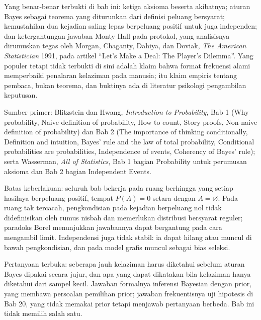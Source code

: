 \begin{untukpeneliti}
Yang benar-benar terbukti di bab ini: ketiga aksioma beserta akibatnya; aturan Bayes
sebagai teorema yang diturunkan dari definisi peluang bersyarat; kemustahilan dua
kejadian saling lepas berpeluang positif untuk juga independen; dan ketergantungan
jawaban Monty Hall pada protokol, yang analisisnya dirumuskan tegas oleh Morgan,
Chaganty, Dahiya, dan Doviak, \emph{The American Statistician} 1991, pada artikel
``Let's Make a Deal: The Player's Dilemma''. Yang populer tetapi tidak terbukti di sini
adalah klaim bahwa format frekuensi alami memperbaiki penalaran kelaziman pada manusia;
itu klaim empiris tentang pembaca, bukan teorema, dan buktinya ada di literatur
psikologi pengambilan keputusan.
\end{untukpeneliti}

Sumber primer: Blitzstein dan Hwang, \emph{Introduction to Probability}, Bab 1 (Why
probability, Naive definition of probability, How to count, Story proofs, Non-naive
definition of probability) dan Bab 2 (The importance of thinking conditionally,
Definition and intuition, Bayes' rule and the law of total probability, Conditional
probabilities are probabilities, Independence of events, Coherency of Bayes' rule);
serta Wasserman, \emph{All of Statistics}, Bab 1 bagian Probability untuk perumusan
aksioma dan Bab 2 bagian Independent Events.

Batas keberlakuan: seluruh bab bekerja pada ruang berhingga yang setiap hasilnya
berpeluang positif, tempat $P(A)=0$ setara dengan $A=\varnothing$. Pada ruang tak
tercacah, pengkondisian pada kejadian berpeluang nol tidak didefinisikan oleh rumus
nisbah dan memerlukan distribusi bersyarat reguler; paradoks Borel menunjukkan jawabannya
dapat bergantung pada cara mengambil limit. Independensi juga tidak stabil: ia dapat
hilang atau muncul di bawah pengkondisian, dan pada model grafis muncul sebagai bias
seleksi.

Pertanyaan terbuka: seberapa jauh kelaziman harus diketahui sebelum aturan Bayes dipakai
secara jujur, dan apa yang dapat dikatakan bila kelaziman hanya diketahui dari sampel
kecil. Jawaban formalnya inferensi Bayesian dengan prior, yang membawa persoalan
pemilihan prior; jawaban frekuentisnya uji hipotesis di Bab 20, yang tidak memakai prior
tetapi menjawab pertanyaan berbeda. Bab ini tidak memilih salah satu.

